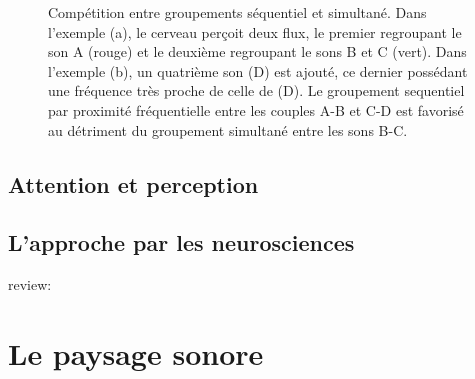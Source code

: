 \begin{figure}[bth]
        \myfloatalign
        \caption[Compétition entre groupements séquentiel et simultané]{Compétition entre groupements séquentiel et simultané. Dans l'exemple (a), le cerveau perçoit deux flux, le premier regroupant le son A (rouge) et le deuxième regroupant le sons B et C (vert). Dans l'exemple (b), un quatrième son (D) est ajouté, ce dernier possédant une fréquence très proche de celle de (D). Le groupement sequentiel par proximité fréquentielle entre les couples A-B et C-D est favorisé au détriment du groupement simultané entre les sons B-C.}\label{fig:simvsseq}
\end{figure}

\subsection{Attention et perception}

\subsection{L'approche par les neurosciences}

review: \citep{snyder2007toward}

\section{Le paysage sonore}
\label{sec:paysageSonore}

